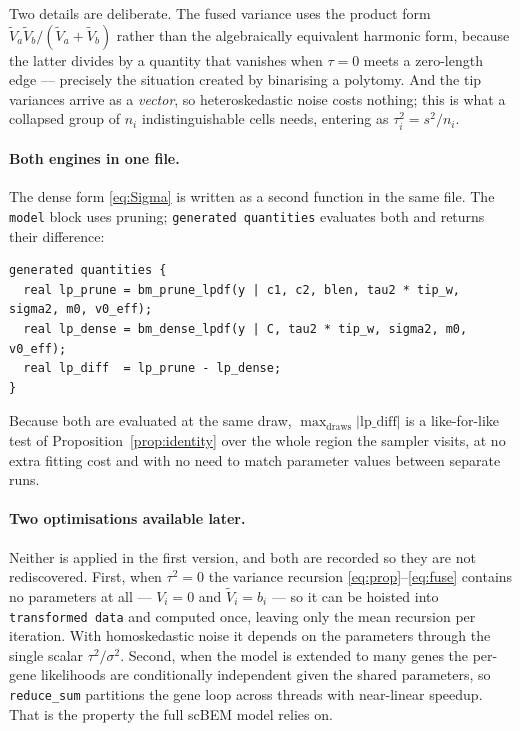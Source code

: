 \documentclass[11pt]{article}
\theoremstyle{remark}
\begin{document}
Two details are deliberate. The fused variance uses the product form
$\tilde V_a \tilde V_b / (\tilde V_a + \tilde V_b)$ rather than the algebraically equivalent
harmonic form, because the latter divides by a quantity that vanishes when $\tau = 0$ meets a
zero-length edge --- precisely the situation created by binarising a polytomy. And the tip
variances arrive as a \emph{vector}, so heteroskedastic noise costs nothing; this is what a
collapsed group of $n_i$ indistinguishable cells needs, entering as $\tau^2_i = s^2/n_i$.

\paragraph{Both engines in one file.} The dense form \eqref{eq:Sigma} is written as a second
function in the same file. The \texttt{model} block uses pruning; \texttt{generated quantities}
evaluates both and returns their difference:

\begin{Verbatim}[fontsize=\small, xleftmargin=1em]
generated quantities {
  real lp_prune = bm_prune_lpdf(y | c1, c2, blen, tau2 * tip_w, sigma2, m0, v0_eff);
  real lp_dense = bm_dense_lpdf(y | C, tau2 * tip_w, sigma2, m0, v0_eff);
  real lp_diff  = lp_prune - lp_dense;
}
\end{Verbatim}

Because both are evaluated at the same draw, $\max_{\text{draws}} |\mathrm{lp\_diff}|$ is a
like-for-like test of Proposition~\ref{prop:identity} over the whole region the sampler visits,
at no extra fitting cost and with no need to match parameter values between separate runs.

\paragraph{Two optimisations available later.} Neither is applied in the first version, and
both are recorded so they are not rediscovered. First, when $\tau^2 = 0$ the variance recursion
\eqref{eq:prop}--\eqref{eq:fuse} contains no parameters at all --- $V_i = 0$ and
$\tilde V_i = b_i$ --- so it can be hoisted into \texttt{transformed data} and computed once,
leaving only the mean recursion per iteration. With homoskedastic noise it depends on the
parameters through the single scalar $\tau^2/\sigma^2$. Second, when the model is extended to
many genes the per-gene likelihoods are conditionally independent given the shared parameters,
so \texttt{reduce\_sum} partitions the gene loop across threads with near-linear speedup. That
is the property the full scBEM model relies on.
\end{document}

